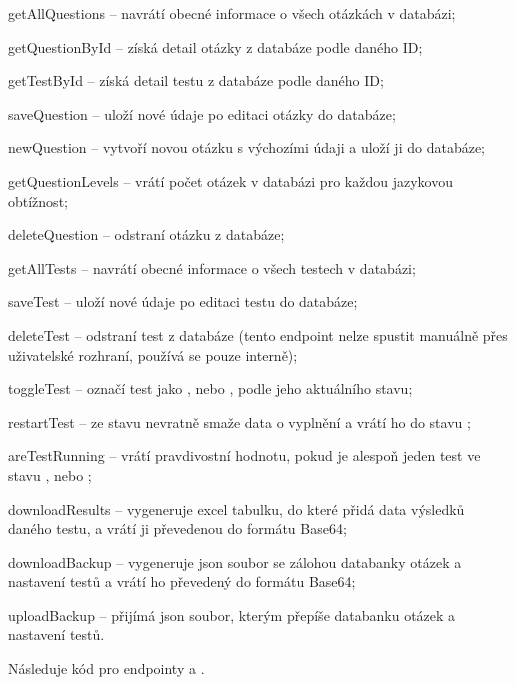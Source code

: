 \begin{compactitem}
    \item getAllQuestions -- navrátí obecné informace o všech otázkách v databázi;
    \item getQuestionById -- získá detail otázky z databáze podle daného ID;
    \item getTestById -- získá detail testu z databáze podle daného ID;
    \item saveQuestion -- uloží nové údaje po editaci otázky do databáze;
    \item newQuestion -- vytvoří novou otázku s výchozími údaji a uloží ji do databáze;
    \item getQuestionLevels -- vrátí počet otázek v databázi pro každou jazykovou obtížnost;
    \item deleteQuestion -- odstraní otázku z databáze;
    \item getAllTests -- navrátí obecné informace o všech testech v databázi;
    \item saveTest -- uloží nové údaje po editaci testu do databáze;
    \item deleteTest -- odstraní test z databáze (tento endpoint nelze spustit manuálně přes uživatelské rozhraní, používá se pouze interně);
    \item toggleTest -- označí test jako , nebo , podle jeho aktuálního stavu;
    \item restartTest -- ze stavu  nevratně smaže data o vyplnění a vrátí ho do stavu ;
    \item areTestRunning -- vrátí pravdivostní hodnotu, pokud je alespoň jeden test ve stavu , nebo ;
    \item downloadResults -- vygeneruje excel tabulku, do které přidá data výsledků daného testu, a vrátí ji převedenou do formátu Base64;
    \item downloadBackup -- vygeneruje json soubor se zálohou databanky otázek a nastavení testů a vrátí ho převedený do formátu Base64;
    \item uploadBackup -- přijímá json soubor, kterým přepíše databanku otázek a nastavení testů.
\end{compactitem}

Následuje kód pro endpointy  a .

